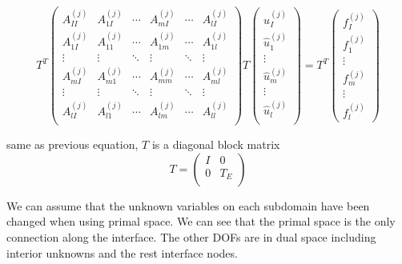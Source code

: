 \begin{equation}
T^{T} \begin{pmatrix}
A_{II}^{(j)} & A_{1I}^{(j)} & \cdots & A_{mI}^{(j)} & \cdots & A_{l I}^{(j)} \\
A_{1 I}^{(j)} & A_{11}^{(j)} & \cdots & A_{1m}^{(j)} & \cdots & A_{1l}^{(j)} \\
\vdots & \vdots & \ddots & \vdots & \ddots & \vdots \\
A_{mI}^{(j)} & A_{m1}^{(j)} & \cdots & A_{mm}^{(j)} & \cdots & A_{ml}^{(j)} \\
\vdots & \vdots & \ddots & \vdots & \ddots & \vdots \\
A_{lI}^{(j)} & A_{l1}^{(j)} & \cdots & A_{lm}^{(j)} & \cdots & A_{ll}^{(j)}\\
\end{pmatrix} T \begin{pmatrix}
u_{I}^{(j)} \\ \hat{u}_{1}^{(j)} \\ \vdots \\ \hat{u}_{m}^{(j)} \\ \vdots \\ \hat{u}_{l}^{(j)}\\
\end{pmatrix} = T^{T} \begin{pmatrix}
f_{I}^{(j)} \\ f_{1}^{(j)} \\ \vdots \\ f_{m}^{(j)} \\ \vdots \\ f_{l}^{(j)}
\end{pmatrix}
\end{equation}

same as previous equation, $ T $ is a diagonal block matrix 
\begin{equation}
T = \begin{pmatrix}
I & 0 \\ 
0 & T_{E}\\
\end{pmatrix}
\end{equation}

 We can assume that the unknown variables on each subdomain have been changed when using primal space. We can see that the primal space is the only connection along the interface. The other DOFs are in dual space including interior unknowns and the rest interface nodes.

